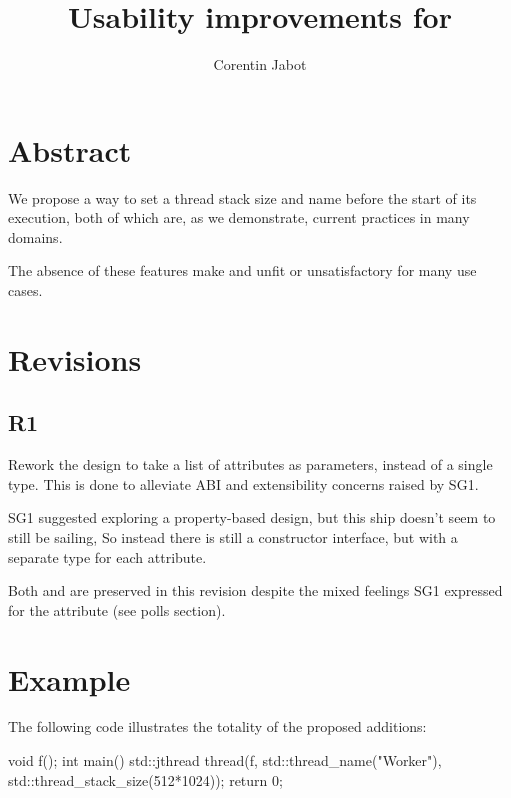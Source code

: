 \documentclass{wg21}
\title{Usability improvements for \tcode{std::thread}}
\author{Corentin Jabot}{corentin.jabot@gmail.com}
\begin{document}
\maketitle

\setlength{\arrayrulewidth}{0.2mm}
\setlength{\tabcolsep}{8pt}
\renewcommand{\arraystretch}{1.}

\def\changemargin#1#2{\list{}{\rightmargin#2\leftmargin#1}\item[]}
\let\endchangemargin=\endlist
\setlength\extrarowheight{5pt}


\section{Abstract}

We propose a way to set a thread stack size and name before the start of its execution, both of which are,
as we demonstrate, current practices in many domains.

The absence of these features make  and  unfit or unsatisfactory for many use cases.

\section{Revisions}

\subsection{R1}

Rework the design to take a list of attributes as parameters, instead of a single type.
This is done to alleviate ABI and extensibility concerns raised by SG1.

SG1 suggested exploring a property-based design, but this ship doesn't seem to still be sailing,
So instead there is still a constructor interface, but with a separate type for each attribute.

Both  and  are preserved in this revision despite the
mixed feelings SG1 expressed for the  attribute (see polls section).

\section{Example}

The following code illustrates the totality of the proposed additions:

\begin{colorblock}
void f();
int main() {
    std::jthread thread(f,
                       std::thread_name("Worker"),
                       std::thread_stack_size(512*1024));
    return 0;
}
\end{colorblock}
\end{document}
